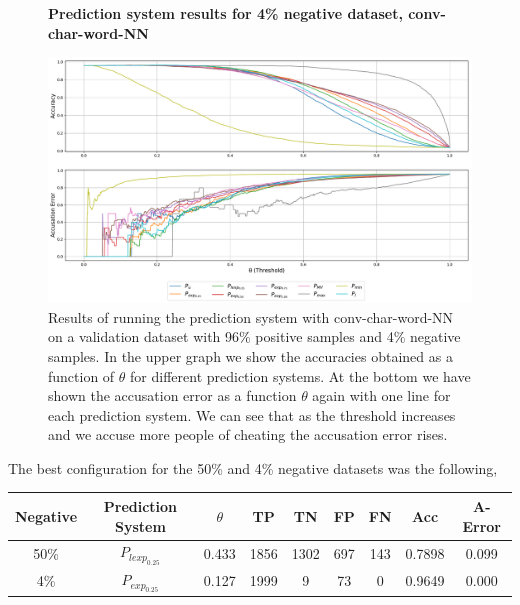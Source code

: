 \begin{figure}
    \centering
    \textbf{Prediction system results for 4\% negative dataset, \gls{conv-char-word-NN}}\par\medskip
    \includegraphics[scale=0.33]{./pictures/experiments/conv_char_word_nn/prediction_system_04}
    \caption{Results of running the prediction system with
        \gls{conv-char-word-NN} on a validation dataset with 96\% positive
        samples and 4\% negative samples. In the upper graph we show the
        accuracies obtained as a function of $\theta$ for different prediction
        systems. At the bottom we have shown the accusation error as a function
        $\theta$ again with one line for each prediction system. We can see that
        as the threshold increases and we accuse more people of cheating the
        accusation error rises.}
    \label{fig:conv-char-word-NN-pred-4}
\end{figure}

The best configuration for the 50\% and 4\% negative datasets was the
following,

\begin{center}
    \begin{adjustbox}{center}
    \begin{tabular}{|c|c|c|c|c|c|c|c|c|}
        \hline
        Negative  & Prediction System & $\theta$ & TP   & TN   & FP  & FN  &
        Acc       & A-Error
        \\ \hline
        50\%      & $P_{lexp_{0.25}}$ & 0.433    & 1856 & 1302 & 697 & 143 &
        0.7898    & 0.099
        \\ \hline
        4\%       & $P_{exp_{0.25}}$  & 0.127    & 1999 & 9    & 73  & 0   &
        0.9649    & 0.000
        \\ \hline
    \end{tabular}
    \end{adjustbox}
\end{center}


